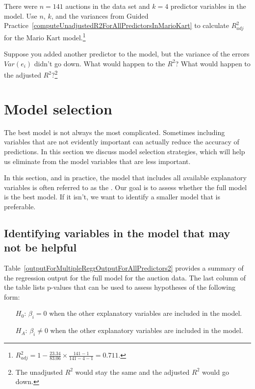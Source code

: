 \begin{exercise}
There were $n=141$ auctions in the  data set and $k=4$ predictor variables in the model. Use $n$, $k$, and the variances from Guided Practice~\ref{computeUnadjustedR2ForAllPredictorsInMarioKart} to calculate $R_{adj}^2$ for the Mario Kart model.\footnote{$R_{adj}^2 = 1 - \frac{23.34}{83.06}\times \frac{141-1}{141-4-1} = 0.711$.}
\end{exercise}

\begin{exercise}
Suppose you added another predictor to the model, but the variance of the errors $Var(e_i)$ didn't go down. What would happen to the $R^2$? What would happen to the adjusted $R^2$?\hspace{0.7mm}\footnote{The unadjusted $R^2$ would stay the same and the adjusted $R^2$ would go down.}
\end{exercise}



\section{Model selection}
\label{modelSelection}


The best model is not always the most complicated. Sometimes including variables that are not evidently important can actually reduce the accuracy of predictions. In this section we discuss model selection strategies, which will help us eliminate from the model variables that are less important.

In this section, and in practice, the model that includes all available explanatory variables is often referred to as the . Our goal is to assess whether the full model is the best model. If it isn't, we want to identify a smaller model that is preferable.

\subsection{Identifying variables in the model that may not be helpful}

Table~\ref{outputForMultipleRegrOutputForAllPredictors2} provides a summary of the regression output for the full model for the auction data. The last column of the table lists p-values that can be used to assess hypotheses of the following form:
\begin{itemize}
\setlength{\itemsep}{0mm}
\item[$H_0$:] $\beta_i = 0$ when the other explanatory variables are included in the model.
\item[$H_A$:] $\beta_i \neq 0$ when the other explanatory variables are included in the model.
\end{itemize}

